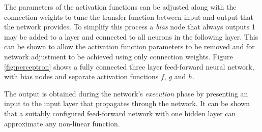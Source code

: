 The parameters of the activation functions can be adjusted along with the
connection weights to tune the transfer function between input and output that
the network provides.  To simplify this process a \textit{bias} node that always outputs 1
may be added to a layer and connected to all neurons in the following layer.
This can be shown to allow the activation function parameters to be removed and
for network adjustment to be achieved using only connection weights. Figure
\ref{fig:perceptron} shows a fully connected three layer feed-forward neural
network, with bias nodes and separate activation functions $f$, $g$ and $h$.

The output is obtained during the network's \textit{execution} phase by
presenting an input to the input layer that propagates through the network.  It
can be shown that a suitably configured feed-forward network with one hidden layer can
approximate any non-linear function.

